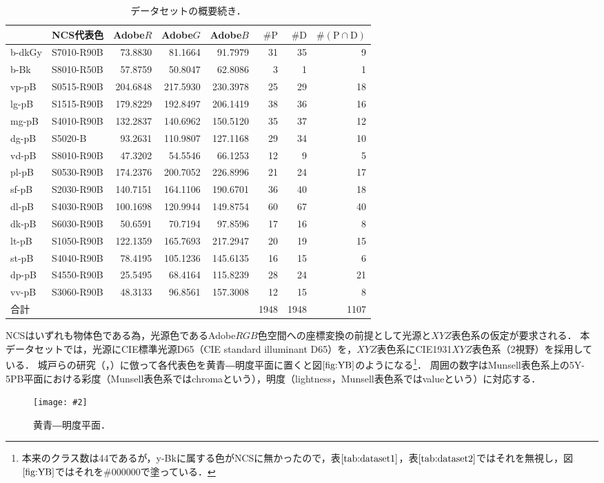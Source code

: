 \documentclass[uplatex,paper=a4,fontsize=4.0truemm,jafontsize=4.0truemm,head_space=30.0truemm,foot_space=30.0truemm,baselineskip=8.0truemm,line_length=40zw,gutter=25.0truemm,oneside,openany,fleqn,hanging_panctuation,open_bracket_pos=nibu_tentsuki,dvipdfmx,jis2004,book,titlepage]{jlreq}
\theoremstyle{mystyle}
\newcommand{\zwspace}{\hspace{1zw}\relax}
\newcommand{\captiondot}[1]{\caption{#1．}}
\newcommand{\figureinput}[4]{\begin{figure}[tbp]\centering\texttt{[image: \#2]}\captiondot{#3}\label{fig:#4}\end{figure}}
\newcommand{\tableinput}[4]{\begin{table}[tbp]\centering\captiondot{#3}\label{tab:#4}\begin{tabular}{#1}#2\end{tabular}\end{table}}
\newcommand{\mathdisplaystyle}[1]{\(\displaystyle{#1}\)}
\newcommand{\Reference}[1]{\mathdisplaystyle{\ref{#1}}}
\newcommand{\parentheses}[1]{\left(#1\right)}
\begin{document}
			\tableinput{l|lrrrrrr}{ & NCS代表色 & Adobe\(R\) & Adobe\(G\) & Adobe\(B\) & \(\#\textrm{P}\) & \(\#\textrm{D}\) & \(\#\parentheses{\text{P}\cap\text{D}}\) \\ \hline
				b-dkGy & S7010-R90B & 73.8830 & 81.1664 & 91.7979 & 31 & 35 & 9 \\
				b-Bk & S8010-R50B & 57.8759 & 50.8047 & 62.8086 & 3 & 1 & 1 \\
				vp-pB & S0515-R90B & 204.6848 & 217.5930 & 230.3978 & 25 & 29 & 18 \\
				lg-pB & S1515-R90B & 179.8229 & 192.8497 & 206.1419 & 38 & 36 & 16 \\
				mg-pB & S4010-R90B & 132.2837 & 140.6962 & 150.5120 & 35 & 37 & 12 \\
				dg-pB & S5020-B & 93.2631 & 110.9807 & 127.1168 & 29 & 34 & 10 \\
				vd-pB & S8010-R90B & 47.3202 & 54.5546 & 66.1253 & 12 & 9 & 5 \\
				pl-pB & S0530-R90B & 174.2376 & 200.7052 & 226.8996 & 21 & 24 & 17 \\
				sf-pB & S2030-R90B & 140.7151 & 164.1106 & 190.6701 & 36 & 40 & 18 \\
				dl-pB & S4030-R90B & 100.1698 & 120.9944 & 149.8754 & 60 & 67 & 40 \\
				dk-pB & S6030-R90B & 50.6591 & 70.7194 & 97.8596 & 17 & 16 & 8 \\
				lt-pB & S1050-R90B & 122.1359 & 165.7693 & 217.2947 & 20 & 19 & 15 \\
				st-pB & S4040-R90B & 78.4195 & 105.1236 & 145.6135 & 16 & 15 & 6 \\
				dp-pB & S4550-R90B & 25.5495 & 68.4164 & 115.8239 & 28 & 24 & 21 \\
				vv-pB & S3060-R90B & 48.3133 & 96.8561 & 157.3008 & 12 & 15 & 8 \\ \hline
				合計 &  &  &  &  & 1948 & 1948 & 1107}{データセットの概要\zwspace 続き}{dataset2}
			NCSはいずれも物体色である為，光源色であるAdobe\mathdisplaystyle{RGB}色空間への座標変換の前提として光源と\mathdisplaystyle{XYZ}表色系の仮定が要求される．
			本データセットでは，光源にCIE標準光源D65（CIE standard illuminant D65）を，\mathdisplaystyle{XYZ}表色系にCIE1931\mathdisplaystyle{XYZ}表色系（2\textdegree 視野）\cite[pp.~28--30]{Yaguchi2017a}を採用している．
			城戸らの研究（\cite[図1]{Kido2017}，\cite[図1]{Kido2018}）に倣って各代表色を黄青―明度平面に置くと図\Reference{fig:YB}のようになる\footnote{本来のクラス数は44であるが，y-Bkに属する色がNCSに無かったので，表\Reference{tab:dataset1}，表\Reference{tab:dataset2}ではそれを無視し，図\Reference{fig:YB}ではそれを\#000000で塗っている．}．
			周囲の数字はMunsell表色系上の5Y-5PB平面における彩度（Munsell表色系ではchromaという），明度（lightness，Munsell表色系ではvalueという）に対応する．
			\figureinput{width=\linewidth}{D:/a/figs/YB.png}{黄青―明度平面}{YB}
\end{document}
